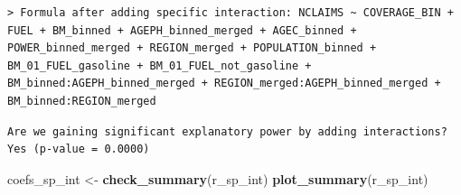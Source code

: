 \documentclass[
  english,
  11pt,
]{article}
\newenvironment{Shaded}{\begin{snugshade}}{\end{snugshade}}
\newcommand{\AttributeTok}[1]{\textcolor[rgb]{0.13,0.29,0.53}{#1}}
\newcommand{\DecValTok}[1]{\textcolor[rgb]{0.00,0.00,0.81}{#1}}
\newcommand{\FloatTok}[1]{\textcolor[rgb]{0.00,0.00,0.81}{#1}}
\newcommand{\FunctionTok}[1]{\textcolor[rgb]{0.13,0.29,0.53}{\textbf{#1}}}
\newcommand{\NormalTok}[1]{#1}
\newcommand{\OtherTok}[1]{\textcolor[rgb]{0.56,0.35,0.01}{#1}}
\newcommand{\SpecialCharTok}[1]{\textcolor[rgb]{0.81,0.36,0.00}{\textbf{#1}}}
\newcommand{\StringTok}[1]{\textcolor[rgb]{0.31,0.60,0.02}{#1}}
\begin{document}
\begin{verbatim}
> Formula after adding specific interaction: NCLAIMS ~ COVERAGE_BIN + FUEL + BM_binned + AGEPH_binned_merged + AGEC_binned + POWER_binned_merged + REGION_merged + POPULATION_binned + BM_01_FUEL_gasoline + BM_01_FUEL_not_gasoline + BM_binned:AGEPH_binned_merged + REGION_merged:AGEPH_binned_merged + BM_binned:REGION_merged
\end{verbatim}

\begin{Shaded}
\end{Shaded}

\begin{verbatim}
Are we gaining significant explanatory power by adding interactions? Yes (p-value = 0.0000)
\end{verbatim}

\begin{Shaded}
\begin{Highlighting}[]
\NormalTok{coefs\_sp\_int }\OtherTok{\textless{}{-}} \FunctionTok{check\_summary}\NormalTok{(r\_sp\_int)}
\FunctionTok{plot\_summary}\NormalTok{(r\_sp\_int)}
\end{Highlighting}
\end{Shaded}
\end{document}
